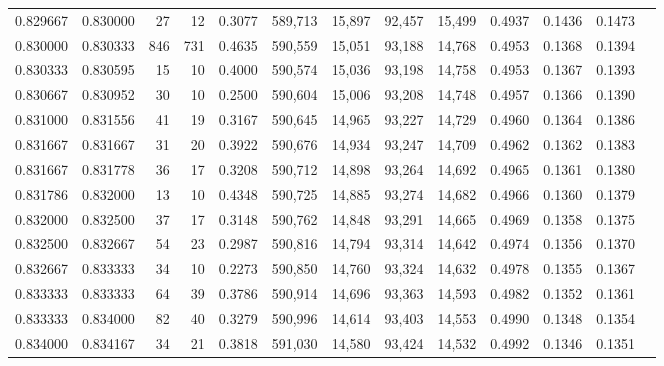 \begin{tabular}{rrrrrrrrrrrrr}
0.829667 & 0.830000 &    27 &  12 &                                     0.3077 & 589,713 &  15,897 &  92,457 &  15,499 & 0.4937 & 0.1436 & 0.1473 \\
0.830000 & 0.830333 &   846 & 731 &                                     0.4635 & 590,559 &  15,051 &  93,188 &  14,768 & 0.4953 & 0.1368 & 0.1394 \\
0.830333 & 0.830595 &    15 &  10 &                                     0.4000 & 590,574 &  15,036 &  93,198 &  14,758 & 0.4953 & 0.1367 & 0.1393 \\
0.830667 & 0.830952 &    30 &  10 &                                     0.2500 & 590,604 &  15,006 &  93,208 &  14,748 & 0.4957 & 0.1366 & 0.1390 \\
0.831000 & 0.831556 &    41 &  19 &                                     0.3167 & 590,645 &  14,965 &  93,227 &  14,729 & 0.4960 & 0.1364 & 0.1386 \\
0.831667 & 0.831667 &    31 &  20 &                                     0.3922 & 590,676 &  14,934 &  93,247 &  14,709 & 0.4962 & 0.1362 & 0.1383 \\
0.831667 & 0.831778 &    36 &  17 &                                     0.3208 & 590,712 &  14,898 &  93,264 &  14,692 & 0.4965 & 0.1361 & 0.1380 \\
0.831786 & 0.832000 &    13 &  10 &                                     0.4348 & 590,725 &  14,885 &  93,274 &  14,682 & 0.4966 & 0.1360 & 0.1379 \\
0.832000 & 0.832500 &    37 &  17 &                                     0.3148 & 590,762 &  14,848 &  93,291 &  14,665 & 0.4969 & 0.1358 & 0.1375 \\
0.832500 & 0.832667 &    54 &  23 &                                     0.2987 & 590,816 &  14,794 &  93,314 &  14,642 & 0.4974 & 0.1356 & 0.1370 \\
0.832667 & 0.833333 &    34 &  10 &                                     0.2273 & 590,850 &  14,760 &  93,324 &  14,632 & 0.4978 & 0.1355 & 0.1367 \\
0.833333 & 0.833333 &    64 &  39 &                                     0.3786 & 590,914 &  14,696 &  93,363 &  14,593 & 0.4982 & 0.1352 & 0.1361 \\
0.833333 & 0.834000 &    82 &  40 &                                     0.3279 & 590,996 &  14,614 &  93,403 &  14,553 & 0.4990 & 0.1348 & 0.1354 \\
0.834000 & 0.834167 &    34 &  21 &                                     0.3818 & 591,030 &  14,580 &  93,424 &  14,532 & 0.4992 & 0.1346 & 0.1351 \\

\end{tabular}
